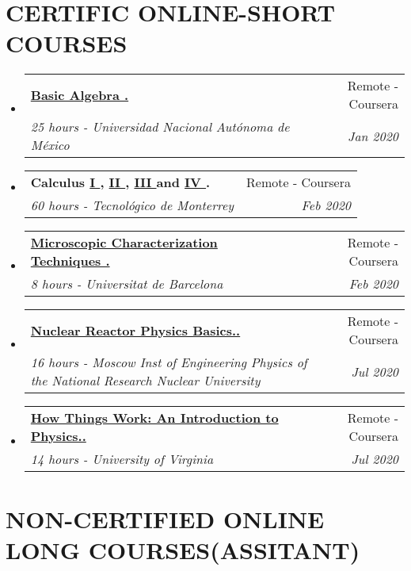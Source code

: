 \documentclass[a4paper,20pt]{article}
\makeatletter
\newcommand{\resumeSubheading}[4]{
  \vspace{-1pt}\item
    \begin{tabular*}{0.97\textwidth}{l@{\extracolsep{\fill}}r}
      \textbf{#1} & #2 \\
      \textit{#3} & \textit{#4} \\
    \end{tabular*}\vspace{-5pt}
}
\newcommand{\resumeSubHeadingListStart}{\begin{itemize}[leftmargin=*]}
\newcommand{\resumeSubHeadingListEnd}{\end{itemize}}
\makeatother
\begin{document}
\section{\textbf{CERTIFIC ONLINE-SHORT COURSES}}
  \resumeSubHeadingListStart
         \resumeSubheading
    { \href{https://coursera.org/share/825bc3a6a9fbf55a91af12cba390237d}{Basic Algebra \faExternalLink .}}{\faDesktop\hspace{1mm}Remote - Coursera}
    {25 hours - Universidad Nacional Autónoma de México}{Jan 2020}
\vspace{-5pt}
	\resumeSubheading
    {Calculus \href{https://coursera.org/share/82e54004a02a5a64f9db9ff2293bf896}{I \faExternalLink }, \href{https://coursera.org/share/1f49205da6fc871c6da2eed93e9a847c}{II \faExternalLink }, \href{https://coursera.org/share/533d9e2b83a79c3951997e2f23ffeb1d}{III \faExternalLink } and \href{https://coursera.org/share/6361a4ee24eccc6133c48d37465dcf01}{IV \faExternalLink }.}{\faDesktop\hspace{1mm}  Remote - Coursera}
    {60 hours - Tecnológico de Monterrey }{Feb 2020}
\vspace{-5pt}
    \resumeSubheading
    { \href{https://coursera.org/share/1306c59bd4646be9d9b29d492a0be4ed}{Microscopic Characterization Techniques \faExternalLink .}}{\faDesktop\hspace{1mm}Remote - Coursera}
    {8 hours - Universitat de Barcelona}{Feb 2020}
\vspace{-5pt}
    \resumeSubheading
    { \href{https://coursera.org/share/f136901ac5f8363c6825fbad7f3db050}{Nuclear Reactor Physics Basics.\faExternalLink .}}{\faDesktop\hspace{1mm}Remote - Coursera}
    {16 hours - Moscow Inst of Engineering Physics of the National Research Nuclear University}{Jul 2020}
\vspace{-5pt}
    \resumeSubheading
    { \href{https://coursera.org/share/28fd9d3360064247d1afe062f0826475}{How Things Work: An Introduction to Physics.\faExternalLink .}}{\faDesktop\hspace{1mm}Remote - Coursera}
    {14 hours - University of Virginia}{Jul 2020}
\vspace{-5pt}
   
\resumeSubHeadingListEnd

\section{\textbf{NON-CERTIFIED ONLINE LONG COURSES(ASSITANT)}}
\end{document}
